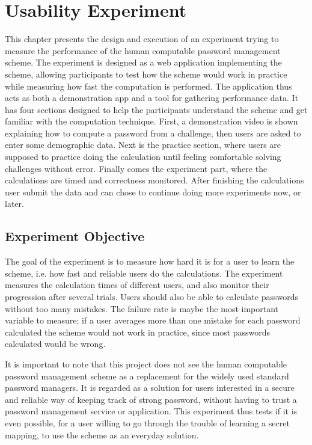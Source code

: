 \chapter{Usability Experiment}\label{ch:experiment}
This chapter presents the design and execution of an experiment trying to measure  the performance of the human computable password management scheme. The experiment is designed as a web application implementing the scheme, allowing participants to test how the scheme would work in practice while measuring how fast the computation is performed. The application thus acts as both a demonstration app and a tool for gathering performance data. It has four sections designed to help the participants understand the scheme and get familiar with the computation technique. First, a demonstration video is shown explaining how to compute a password from a challenge, then users are asked to enter some demographic data. Next is the practice section, where users are supposed to practice doing the calculation until feeling comfortable solving challenges without error. Finally comes the experiment part, where the calculations are timed and correctness monitored. After finishing the calculations user submit the data and can chose to continue doing more experiments now, or later.
\section{Experiment Objective}
The goal of the experiment is to measure how hard it is for a user to learn the scheme, i.e. how fast and reliable users do the calculations. The experiment measures the calculation times of different users, and also monitor their progression after several trials. Users should also be able to calculate passwords without too many mistakes. The failure rate is maybe the most important variable to measure; if a user averages more than one mistake for each password calculated the scheme would not work in practice, since most passwords calculated would be wrong. 
\par It is important to note that this project does not see the human computable password management scheme as a replacement for the widely used standard password managers. It is regarded as a solution for users interested in a secure and reliable way of keeping track of strong password, without having to trust a password management service or application. This experiment thus tests if it is even possible, for a user willing to go through the trouble of learning a secret mapping, to use the scheme as an everyday solution.

